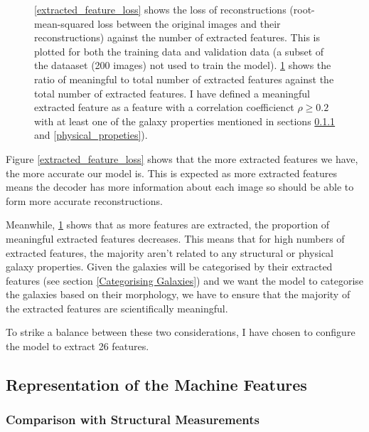 \documentclass[12pt, onecolumn]{article}
\begin{document}
\begin{figure}[H]
\begin{subfigure}[b]{0.49\textwidth}
            \caption{}
            \label{meaningful_extracted_features_ratio}
        \end{subfigure}
        \caption{\ref{extracted_feature_loss} shows the loss of reconstructions (root-mean-squared loss between the original images and their reconstructions) against the number of extracted features. This is plotted for both the training data and validation data (a subset of the dataaset (200 images) not used to train the model). \ref{meaningful_extracted_features_ratio} shows the ratio of meaningful to total number of extracted features against the total number of extracted features. I have defined a meaningful extracted feature as a feature with a correlation coefficienct $\rho \geq 0.2$ with at least one of the galaxy properties mentioned in sections \ref{structual_measurements} and \ref{physical_propeties}).}
        \label{optimal_exracted_features}
    \end{figure}

    Figure \ref{extracted_feature_loss} shows that the more extracted features we have, the more accurate our model is. This is expected as more extracted features means the decoder has more information about each image so should be able to form more accurate reconstructions.

    Meanwhile, \ref{meaningful_extracted_features_ratio} shows that as more features are extracted, the proportion of meaningful extracted features decreases. This means that for high numbers of extracted features, the majority aren't related to any structural or physical galaxy properties. Given the galaxies will be categorised by their extracted features (see section \ref{Categorising Galaxies}) and we want the model to categorise the galaxies based on their morphology, we have to ensure that the majority of the extracted features are scientifically meaningful.

    To strike a balance between these two considerations, I have chosen to configure the model to extract 26 features.


    \subsection{Representation of the Machine Features}
    \label{Representation of the Machine Features}

    
        \subsubsection{Comparison with Structural Measurements}
        \label{structual_measurements}
\end{document}

